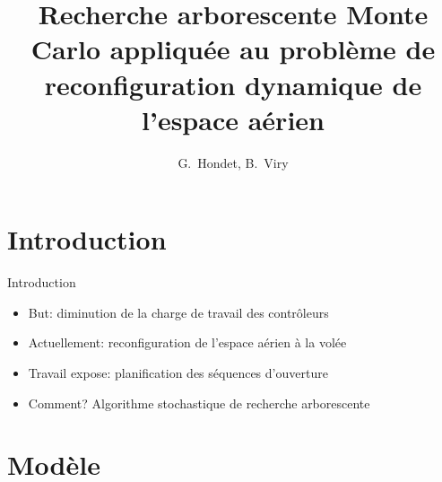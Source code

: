 \documentclass[tikz]{beamer}
\title[Reconfiguration par Monte Carlo]{%
  Recherche arborescente Monte Carlo appliquée au problème de reconfiguration
  dynamique de l'espace aérien
}
\author[Hondet, Viry]{G.~Hondet, B.~Viry}
\begin{document}
\begin{frame}
  \titlepage{}
\end{frame}


\section*{Introduction}

\begin{frame}[c]{Introduction}
  \begin{itemize}
    \item But: diminution de la charge de travail des contrôleurs
    \item Actuellement: reconfiguration de l'espace aérien à la volée
    \item Travail expose: planification des séquences d'ouverture
    \item Comment? Algorithme stochastique de recherche arborescente
  \end{itemize}
\end{frame}

\section{Modèle}
\end{document}
